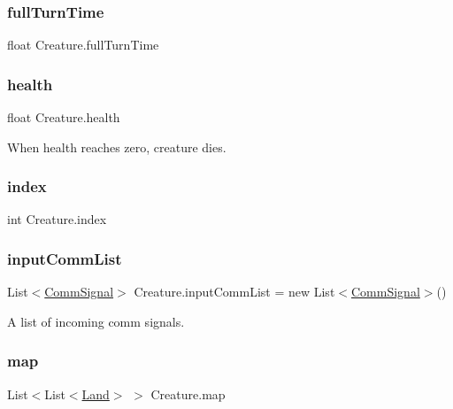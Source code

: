 \subsubsection{\texorpdfstring{full\+Turn\+Time}{fullTurnTime}}
{\footnotesize\ttfamily float Creature.\+full\+Turn\+Time}

\mbox{\label{class_creature_a3c0b32a41569e073d4dd717f25262d56}} 
\subsubsection{\texorpdfstring{health}{health}}
{\footnotesize\ttfamily float Creature.\+health}



When health reaches zero, creature dies. 

\mbox{\label{class_creature_a358feda4f0a406a8f28bed6acb170c37}} 
\subsubsection{\texorpdfstring{index}{index}}
{\footnotesize\ttfamily int Creature.\+index}

\mbox{\label{class_creature_a4051d02a4fb5ccb411e07cea92273a5a}} 
\subsubsection{\texorpdfstring{input\+Comm\+List}{inputCommList}}
{\footnotesize\ttfamily List$<$\mbox{\hyperlink{class_comm_signal}{Comm\+Signal}}$>$ Creature.\+input\+Comm\+List = new List$<$\mbox{\hyperlink{class_comm_signal}{Comm\+Signal}}$>$()}



A list of incoming comm signals. 

\mbox{\label{class_creature_ac96bc7e8b95322eeaadf280d715f738a}} 
\subsubsection{\texorpdfstring{map}{map}}
{\footnotesize\ttfamily List$<$List$<$\mbox{\hyperlink{class_land}{Land}}$>$ $>$ Creature.\+map}

